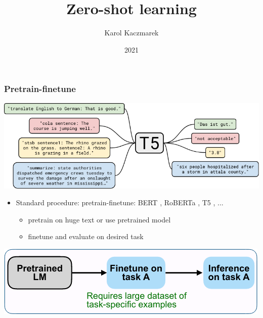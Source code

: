\documentclass{beamer}
\title{Zero-shot learning}
\date{2021}
\author{Karol Kaczmarek}
\begin{document}
\begin{frame}
    \titlepage
\end{frame}

\begin{frame}
    \frametitle{Pretrain-finetune}
    \begin{center}
        \includegraphics[scale=1.1]{img/t5.png}
    \end{center}
    \begin{itemize}
        \item Standard procedure: pretrain-finetune: BERT \cite{bert}, RoBERTa \cite{roberta}, T5 \cite{t5}, ...
        \begin{itemize}
            \item pretrain on huge text or use pretrained model
            \item finetune and evaluate on desired task
        \end{itemize}
    \end{itemize}
    \begin{center}
        \includegraphics[scale=1.5]{img/zero_shot_method0.png}
    \end{center}
\end{frame}
\end{document}
